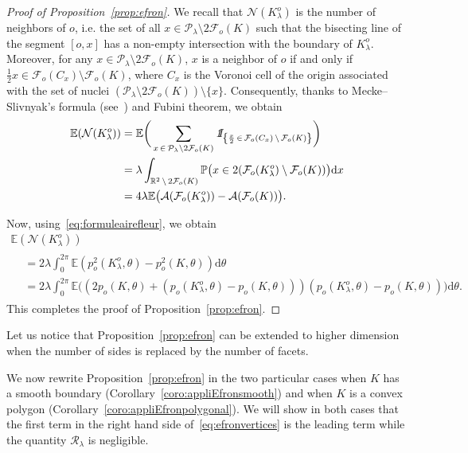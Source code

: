 \documentclass[10pt]{amsart}
\theoremstyle{definition}\newtheorem{defi}[theo]{Definition}\newtheorem{rema}[theo]{Remark}\newtheorem{exam}[theo]{Example}\newtheorem{exem}[theo]{Example}\newtheorem{nota}[theo]{Notation}
\newcommand{\indicat}{{\text{1}}\negthickspace\text{I}}
\newcommand{\cA}{\mathcal{A}}
\newcommand{\cF}{\mathcal{F}}
\newcommand{\cN}{\mathcal{N}}
\newcommand{\cP}{\mathcal{P}}
\newcommand{\cR}{\mathcal{R}}
\newcommand{\dd}{\mathrm{d}}
\newcommand{\E}{\mathbb{E}}
\renewcommand{\P}{\mathbb{P}}
\newcommand{\R}{\mathbb{R}}
\newcommand{\pass}{\vspace{0.3cm}\noindent}
\newcommand{\noi}{\noindent}
\begin{document}
\begin{proof}[{Proof of Proposition~\ref{prop:efron}}]
We recall that $\cN(K_{\lambda}^o)$ is the number of neighbors of $o$, i.e. the set of all $x\in\cP_{\lambda}\setminus 2\cF_o(K)$ such that the bisecting line of the segment $[o,x]$ has a non-empty intersection with the boundary of $K_{\lambda}^o$. Moreover, for any $x\in\cP_{\lambda}\setminus 2\cF_o(K)$, $x$ is a neighbor of $o$ if and only if $\tfrac{1}{2}x\in \cF_o(C_x)\setminus\cF_o(K)$, where $C_x$ is the Voronoi cell of the origin associated with the set of nuclei $(\cP_{\lambda}\setminus 2\cF_o(K))\setminus\{x\}$. Consequently, thanks to Mecke--Slivnyak's formula (see~\cite[Corollary~3.2.3]{SW}) and Fubini theorem, we obtain
\begin{align*}
\E(\cN(K_{\lambda}^o)) &= \E\bigg(\sum_{x\,\in\,\cP_{\lambda}\setminus2\cF_o(K)}{\emph{\indicat}}_{\left\{\frac{x}{2}\,\in\,\cF_o(C_x)\,\setminus\,\cF_o(K)\right\}}\bigg)\\
& = \lambda\int_{\R^2\,\setminus\,2\cF_o(K)}\P\big(x\in 2(\cF_o(K_{\lambda}^o)\setminus\cF_o(K))\big)\dd x \\
& = 4\lambda\E\big(\cA(\cF_o(K_{\lambda}^o))-\cA(\cF_o(K))\big).
\end{align*}

Now, using~\eqref{eq:formuleairefleur}, we obtain
\begin{multline*}\label{sophie}
\E(\cN(K_{\lambda}^o)) \\
\begin{aligned}
& = 2\lambda\int_0^{2\pi}\E\left(p_o^2\left(K_{\lambda}^o,\theta\right)-p_o^2(K,\theta)\right)\dd\theta\\
& = 2\lambda\int_0^{2\pi}\E\big((2p_o(K,\theta)+(p_o(K_{\lambda}^o,\theta)-p_o(K,\theta)))(p_o(K_{\lambda}^o,\theta)-p_o(K,\theta))\big)\dd\theta.
\end{aligned}
\end{multline*}
This completes the proof of Proposition~\ref{prop:efron}.
\end{proof}

Let us notice that Proposition~\ref{prop:efron} can be extended to higher dimension when the number of sides is replaced by the number of facets.


We now rewrite Proposition~\ref{prop:efron} in the two particular cases when $K$ has a smooth boundary (Corollary~\ref{coro:appliEfronsmooth}) and when $K$ is a convex polygon (Corollary~\ref{coro:appliEfronpolygonal}). We will show in both cases that the first term in the right hand side of~\eqref{eq:efronvertices} is the leading term while the quantity ${\cR}_\lambda$ is negligible.
\end{document}
